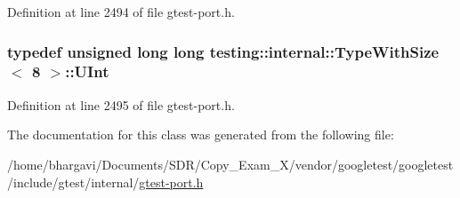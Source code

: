 Definition at line 2494 of file gtest-\/port.\+h.

\subsubsection[{\texorpdfstring{U\+Int}{UInt}}]{\setlength{\rightskip}{0pt plus 5cm}typedef unsigned long long {\bf testing\+::internal\+::\+Type\+With\+Size}$<$ 8 $>$\+::{\bf U\+Int}}\hypertarget{classtesting_1_1internal_1_1_type_with_size_3_018_01_4_a747e21c5aee8faf07ec65cd4c3d1ca62}{}\label{classtesting_1_1internal_1_1_type_with_size_3_018_01_4_a747e21c5aee8faf07ec65cd4c3d1ca62}


Definition at line 2495 of file gtest-\/port.\+h.



The documentation for this class was generated from the following file\+:\begin{DoxyCompactItemize}
\item 
/home/bhargavi/\+Documents/\+S\+D\+R/\+Copy\+\_\+\+Exam\+\_\+X/vendor/googletest/googletest/include/gtest/internal/\hyperlink{gtest-port_8h}{gtest-\/port.\+h}\end{DoxyCompactItemize}
